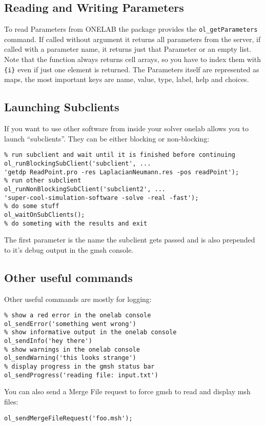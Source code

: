 \documentclass[article,english,colorback,accentcolor=tud9b,11pt]{tudreport}
\begin{document}
		\subsection{Reading and Writing Parameters}
		To read Parameters from ONELAB the package provides the \texttt{ol\_getParameters} command. If called without argument it returns all parameters from the server, if called with a parameter name, it returns just that Parameter or an empty list. Note that the function always returns cell arrays, so you have to index them with \texttt{\{i\}} even if just one element is returned. The Parameters itself are represented as maps, the most important keys are name, value, type, label, help and choices.
		\subsection{Launching Subclients}
		If you want to use other software from inside your solver onelab allows you to launch ``subclients''. They can be either blocking or non-blocking:
		\begin{lstlisting} 
% run subclient and wait until it is finished before continuing
ol_runBlockingSubClient('subclient', ...
'getdp ReadPoint.pro -res LaplacianNeumann.res -pos readPoint');
% run other subclient
ol_runNonBlockingSubClient('subclient2', ...
'super-cool-simulation-software -solve -real -fast');
% do some stuff
ol_waitOnSubClients();
% do someting with the results and exit
		\end{lstlisting}
		The first parameter is the name the subclient gets passed and is also prepended to it's debug output in the gmsh console.

		\subsection{Other useful commands}
		Other useful commands are mostly for logging:
		\begin{lstlisting}
% show a red error in the onelab console 
ol_sendError('something went wrong')
% show informative output in the onelab console
ol_sendInfo('hey there')
% show warnings in the onelab console
ol_sendWarning('this looks strange')
% display progress in the gmsh status bar
ol_sendProgress('reading file: input.txt')
		\end{lstlisting}

		You can also send a Merge File request to force gmsh to read and display msh files:
		\begin{lstlisting}
ol_sendMergeFileRequest('foo.msh');
		\end{lstlisting}
\end{document}
